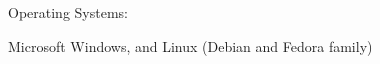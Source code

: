 \documentclass[10pt]{article}
\renewcommand{\section}[1]{\pagebreak[3]%
    \vspace{1.5\baselineskip}%
    \phantomsection\addcontentsline{toc}{section}{#1}%
    \noindent\llap{\sffamily\bfseries\smash{\parbox[t]{\marginparwidth}{%
        \hyphenpenalty=10000\raggedright\MakeUppercase{#1}}}}%
    \vspace{-\baselineskip}\par}
\newcommand{\halfblankline}{\quad\vspace{-0\baselineskip}\pagebreak[3]}
\begin{document}
Operating Systems:
\vspace{0.05in}
\begin{innerlist}
    \item Microsoft Windows, and Linux (Debian and Fedora family)
\end{innerlist}
\vspace{0.1in}









\end{document}
